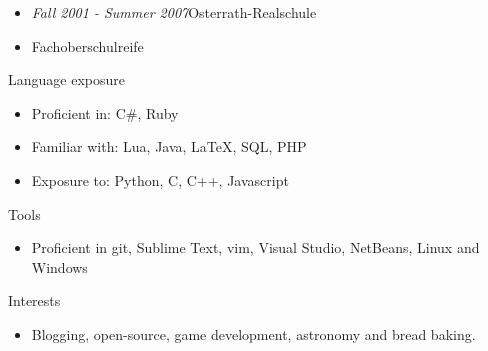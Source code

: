\documentclass[12pt]{article}
\begin{document}
\begin{itemize}
  \setlength{\itemsep}{0cm}
  \setlength{\parskip}{0.1cm}
  \item[] \emph{Fall 2001 - Summer 2007}\hfill Osterrath-Realschule
  \item[] Fachoberschulreife
\end{itemize}

\newpage

\vspace{0.5cm}
{\Large Language exposure}
\begin{itemize}
  \setlength{\itemsep}{0cm}
  \setlength{\parskip}{0cm}
  \item[] Proficient in: C\#, Ruby
  \item[] Familiar with: Lua, Java, LaTeX, SQL, PHP
  \item[] Exposure to: Python, C, C++, Javascript
\end{itemize}

\vspace{0.5cm}
{\Large Tools}
\begin{itemize}
  \setlength{\itemsep}{0cm}
  \setlength{\parskip}{0cm}
  \item[] Proficient in git, Sublime Text, vim, Visual Studio, NetBeans, Linux and Windows
\end{itemize}

\vspace{0.5cm}
{\Large Interests}
\begin{itemize}
  \setlength{\itemsep}{0cm}
  \setlength{\parskip}{0cm}
  \item[] Blogging, open-source, game development, astronomy and bread baking.
\end{itemize}
\end{document}
